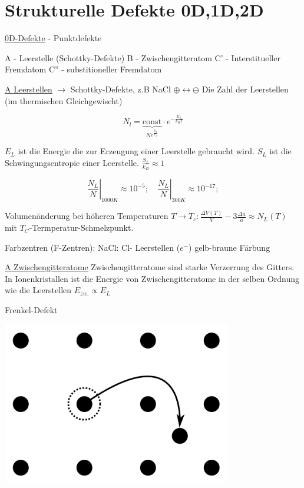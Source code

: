 



\tableofcontents
\setcounter{chapter}{3}
\chapter{Strukturelle Defekte 0D,1D,2D}



\underline{0D-Defekte} - Punktdefekte


A - Leerstelle (Schottky-Defekte)
B - Zwischengitteratom
C' - Interstitueller Fremdatom
C'' - substitioneller Fremdatom

\underline{A Leerstellen} \(\rightarrow\) Schottky-Defekte, z.B NaCl \(\oplus \leftrightarrow \ominus\)
Die Zahl der Leerstellen (im thermischen Gleichgewischt)

\[ N_l = \underbrace{\text{const}}_{Ne^{\frac{S_L}{k_B}}}\cdot e^{-\frac {E_L}{k_B T}}\]

\(E_L\) ist die Energie die zur Erzeugung einer Leerstelle gebraucht
wird. \(S_L\) ist die Schwingungsentropie einer Leerstelle. \(\frac
{S_L}{k_B}\approx 1\)

\[ \left.\frac{N_L}{N}\right|_{1000K}\approx 10^{-5}; \quad
\left.\frac{N_L}{N}\right|_{300K}\approx 10^{-17};\]

Volumenänderung bei höheren Temperaturen \(T \rightarrow T_c:\frac
{\Delta V(T)}{V}-3\frac{\Delta a}{a} \approx N_L(T)\) mit
\(T_C\)-Termperatur-Schmelzpunkt. 

Farbzentren (F-Zentren): 
NaCl: Cl- Leerstellen (\(e^-\)) gelb-braune Färbung

\underline{A Zwischengitteratome}
Zwischengitteratome sind starke Verzerrung des Gitters. In
Ionenkristallen ist die Energie von Zwischengitteratome in der selben
Ordnung wie die Leerstellen \(E_{zw.}\propto E_L\)

Frenkel-Defekt


\includegraphics[width=0.75\textwidth]{kap04_01.png}

